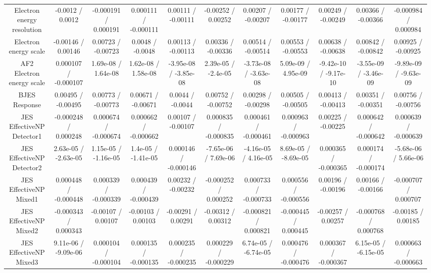 \begin{table}[htbp]
\begin{center}
\begin{tabular}{|c|c|c|c|c|c|c|c|c|c|c|}
  Electron energy resolution & -0.0012 / 0.0012 & -0.000191 / 0.000191 & 0.000111 / -0.000111 & 0.00111 / -0.00111 & -0.00252 / 0.00252 & 0.00207 / -0.00207 & 0.00177 / -0.00177 & 0.00249 / -0.00249 & 0.00366 / -0.00366 & -0.000984 / 0.000984 \\ 
  Electron energy scale & -0.00146 / 0.00146 & 0.00723 / -0.00723 & 0.0048 / -0.0048 & 0.00113 / -0.00113 & 0.00336 / -0.00336 & 0.00514 / -0.00514 & 0.00553 / -0.00553 & 0.00638 / -0.00638 & 0.00842 / -0.00842 & 0.00925 / -0.00925 \\ 
  AF2 Electron energy scale & 0.000107 / -0.000107 & 1.69e-08 / 1.64e-08 & 1.62e-08 / 1.58e-08 & -3.95e-08 / -3.85e-08 & 2.39e-05 / -2.4e-05 & -3.73e-08 / -3.63e-08 & 5.09e-09 / 4.95e-09 & -9.42e-10 / -9.17e-10 & -3.55e-09 / -3.46e-09 & -9.89e-09 / -9.63e-09 \\ 
  BJES Response & 0.00495 / -0.00495 & 0.00773 / -0.00773 & 0.00671 / -0.00671 & 0.0044 / -0.0044 & 0.00752 / -0.00752 & 0.00298 / -0.00298 & 0.00505 / -0.00505 & 0.00413 / -0.00413 & 0.00351 / -0.00351 & 0.00756 / -0.00756 \\ 
  JES EffectiveNP Detector1 & -0.000248 / 0.000248 & 0.000674 / -0.000674 & 0.000662 / -0.000662 & 0.00107 / -0.00107 & 0.000835 / -0.000835 & 0.000461 / -0.000461 & 0.000963 / -0.000963 & 0.00225 / -0.00225 & 0.000642 / -0.000642 & 0.000639 / -0.000639 \\ 
  JES EffectiveNP Detector2 & 2.63e-05 / -2.63e-05 & 1.15e-05 / -1.16e-05 & 1.4e-05 / -1.41e-05 & 0.000146 / -0.000146 & -7.65e-06 / 7.69e-06 & -4.16e-05 / 4.16e-05 & 8.69e-05 / -8.69e-05 & 0.000365 / -0.000365 & 0.000174 / -0.000174 & -5.68e-06 / 5.66e-06 \\ 
  JES EffectiveNP Mixed1 & 0.000448 / -0.000448 & 0.000339 / -0.000339 & 0.000439 / -0.000439 & 0.00232 / -0.00232 & -0.000252 / 0.000252 & 0.000733 / -0.000733 & 0.000556 / -0.000556 & 0.00196 / -0.00196 & 0.00166 / -0.00166 & -0.000707 / 0.000707 \\ 
  JES EffectiveNP Mixed2 & -0.000343 / 0.000343 & -0.00107 / 0.00107 & -0.00103 / 0.00103 & -0.00291 / 0.00291 & -0.00312 / 0.00312 & -0.000821 / 0.000821 & -0.000445 / 0.000445 & -0.00257 / 0.00257 & -0.000768 / 0.000768 & -0.00185 / 0.00185 \\ 
  JES EffectiveNP Mixed3 & 9.11e-06 / -9.09e-06 & 0.000104 / -0.000104 & 0.000135 / -0.000135 & 0.000235 / -0.000235 & 0.000229 / -0.000229 & 6.74e-05 / -6.74e-05 & 0.000476 / -0.000476 & 0.000367 / -0.000367 & 6.15e-05 / -6.15e-05 & 0.000663 / -0.000663 \\ 

\end{tabular}
\end{center}
\end{table}
